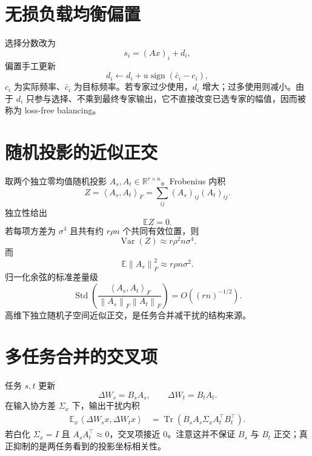 \documentclass[UTF8,12pt,a4paper,fontset=none]{ctexart}
\numberwithin{equation}{section}
\newcommand{\R}{\mathbb{R}}
\newcommand{\E}{\mathbb{E}}
\newcommand{\norm}[1]{\left\lVert #1\right\rVert}
\newcommand{\ip}[2]{\left\langle #1,#2\right\rangle}
\newcommand{\tr}{\operatorname{Tr}}
\begin{document}
\section{无损负载均衡偏置}
选择分数改为
\begin{equation}
 s_i=(Ax)_i+d_i,
\end{equation}
偏置手工更新
\begin{equation}
 d_i\leftarrow d_i+u\operatorname{sign}(\bar c_i-c_i),
\end{equation}
$c_i$ 为实际频率、$\bar c_i$ 为目标频率。若专家过少使用，$d_i$ 增大；过多使用则减小。由于 $d_i$ 只参与选择、不乘到最终专家输出，它不直接改变已选专家的幅值，因而被称为 loss-free balancing。

\section{随机投影的近似正交}
取两个独立零均值随机投影 $A_s,A_t\in\R^{r\times n}$。Frobenius 内积
\begin{equation}
 Z=\ip{A_s}{A_t}_F=\sum_{ij}(A_s)_{ij}(A_t)_{ij}.
\end{equation}
独立性给出
\begin{equation}
 \E Z=0.
\end{equation}
若每项方差为 $\sigma^4$ 且共有约 $r\rho n$ 个共同有效位置，则
\begin{equation}
 \operatorname{Var}(Z)\approx r\rho^2n\sigma^4.
\end{equation}
而
\begin{equation}
 \E\norm{A_s}_F^2\approx r\rho n\sigma^2.
\end{equation}
归一化余弦的标准差量级
\begin{equation}
 \operatorname{Std}\left(
 \frac{\ip{A_s}{A_t}_F}{\norm{A_s}_F\norm{A_t}_F}
 \right)=O((rn)^{-1/2}).
\end{equation}
高维下独立随机子空间近似正交，是任务合并减干扰的结构来源。

\section{多任务合并的交叉项}
任务 $s,t$ 更新
\begin{equation}
 \Delta W_s=B_sA_s,\qquad \Delta W_t=B_tA_t.
\end{equation}
在输入协方差 $\Sigma_x$ 下，输出干扰内积
\begin{align}
 \E_x\ip{\Delta W_sx}{\Delta W_tx}
 &=\tr(B_sA_s\Sigma_xA_t^\top B_t^\top).
\end{align}
若白化 $\Sigma_x=I$ 且 $A_sA_t^\top\approx0$，交叉项接近 0。注意这并不保证 $B_s$ 与 $B_t$ 正交；真正抑制的是两任务看到的投影坐标相关性。
\end{document}
